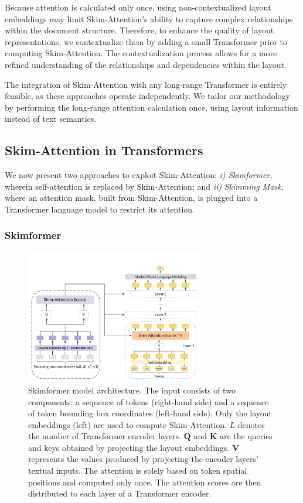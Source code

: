 Because attention is calculated only once, using non-contextualized layout embeddings may limit Skim-Attention's ability to capture complex relationships within the document structure. Therefore, to enhance the quality of layout representations, we contextualize them by adding a small Transformer prior to computing Skim-Attention. The contextualization process allows for a more refined understanding of the relationships and dependencies within the layout.

The integration of Skim-Attention with any long-range Transformer is entirely feasible, as these approaches operate independently. We tailor our methodology by performing the long-range attention calculation once, using layout information instead of text semantics.

\subsection{Skim-Attention in Transformers}

We now present two approaches to exploit Skim-Attention:
\emph{i)} \textit{Skimformer}, wherein self-attention is replaced by Skim-Attention; and \emph{ii)} \textit{Skimming Mask}, where an attention mask, built from Skim-Attention, is plugged into a Transformer language model to restrict its attention.

\subsubsection{Skimformer}

\begin{figure}[h]
    \centering
    \includegraphics[width=0.7\textwidth]{images/chapter3/skimformer-architecture.pdf}
    \caption{Skimformer model architecture. The input consists of two components: a sequence of tokens (right-hand side) and a sequence of token bounding box coordinates (left-hand side). Only the layout embeddings (left) are used to compute Skim-Attention. $L$ denotes the number of Transformer encoder layers. $\bm{Q}$ and $\bm{K}$ are the queries and keys obtained by projecting the layout embeddings. $\bm{V}$ represents the values produced by projecting the encoder layers' textual inputs. The attention is solely based on token spatial positions and computed only once. The attention scores are then distributed to each layer of a Transformer encoder.}
    \label{fig:skimformer-architecture}
\end{figure}

